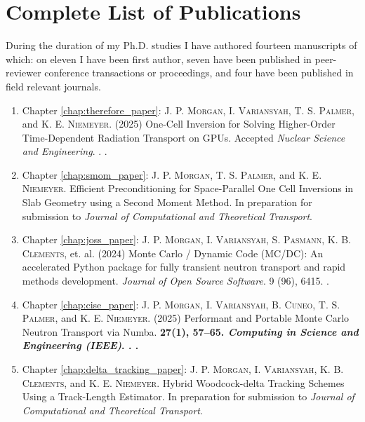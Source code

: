 \chapter{Complete List of Publications}
\label{chap:listopusb}

During the duration of my Ph.D. studies I have authored fourteen manuscripts of which: on eleven I have been first author, seven have been published in peer-reviewer conference transactions or proceedings, and four have been published in field relevant journals.

\begin{enumerate}
    \item Chapter \ref{chap:therefore_paper}: \textsc{J. P. Morgan}, \textsc{I. Variansyah}, \textsc{T. S. Palmer}, and \textsc{K. E. Niemeyer}. (2025) One-Cell Inversion for Solving Higher-Order Time-Dependent Radiation Transport on GPUs. Accepted \emph{Nuclear Science and Engineering}. . .

    \item Chapter \ref{chap:smom_paper}: \textsc{J. P. Morgan},  \textsc{T. S. Palmer}, and \textsc{K. E. Niemeyer}. Efficient Preconditioning for Space-Parallel One Cell Inversions in Slab Geometry using a Second Moment Method. In preparation for submission to \emph{Journal of Computational and Theoretical Transport}.

    \item Chapter \ref{chap:joss_paper}: \textsc{J. P. Morgan}, \textsc{I. Variansyah}, \textsc{S. Pasmann}, \textsc{K. B. Clements}, et. al. (2024) Monte Carlo / Dynamic Code (MC/DC): An accelerated Python package for fully transient neutron transport and rapid methods development. \emph{Journal of Open Source Software}. 9 (96), 6415. .

    \item Chapter \ref{chap:cise_paper}: \textsc{J. P. Morgan}, \textsc{I. Variansyah}, \textsc{B. Cuneo}, \textsc{T. S. Palmer}, and \textsc{K. E. Niemeyer}. (2025) Performant and Portable Monte Carlo Neutron Transport via Numba. \bf{27}(1), 57--65. \emph{Computing in Science and Engineering (IEEE)}. . .

    \item Chapter \ref{chap:delta_tracking_paper}: \textsc{J. P. Morgan}, \textsc{I. Variansyah}, \textsc{K. B. Clements}, and \textsc{K. E. Niemeyer}. Hybrid Woodcock-delta Tracking Schemes Using a Track-Length Estimator. In preparation for submission to \emph{Journal of Computational and Theoretical Transport}.


\end{enumerate}
